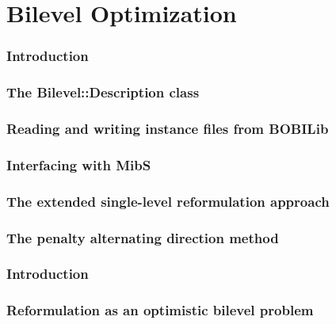\part{Bilevel Optimization}

\section{Introduction}
\section{The \textsf{Bilevel::Description} class}
\section{Reading and writing instance files from \textsf{BOBILib}}



\label{chapter:bilevel:continuous}

\section{Interfacing with \textsf{MibS}}
\section{The extended single-level reformulation approach}
\section{The penalty alternating direction method}

\section{Introduction}
\section{Reformulation as an optimistic bilevel problem}
